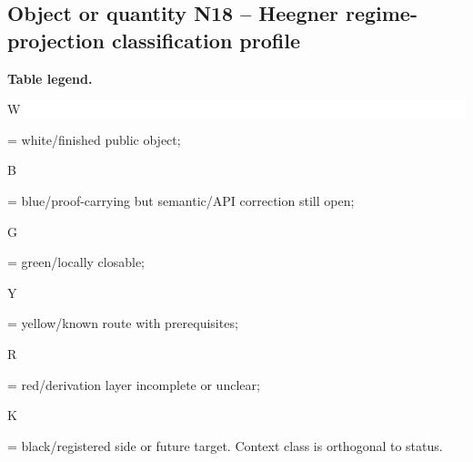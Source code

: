 \subsection*{Object or quantity N18 -- Heegner regime-projection classification profile}
\hypertarget{objproof:N18}{}
\par\smallskip\noindent\begin{minipage}{0.99\linewidth}\footnotesize\raggedright\textbf{Table legend.} \colorbox{white}{\strut W} = white/finished public object; \colorbox{cyan!20}{\strut B} = blue/proof-carrying but semantic/API correction still open; \colorbox{green!18}{\strut G} = green/locally closable; \colorbox{yellow!25}{\strut Y} = yellow/known route with prerequisites; \colorbox{red!20}{\strut R} = red/derivation layer incomplete or unclear; \colorbox{black!18}{\strut K} = black/registered side or future target. Context class is orthogonal to status.\end{minipage}\par\vspace{0.25em}
